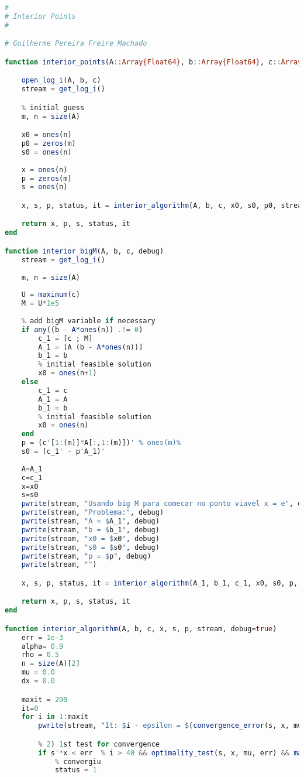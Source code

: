 \documentclass[a4paper]{IEEEtran}
\begin{document}
\begin{lstlisting}[language=Julia,numbers=none]
#
# Interior Points
#

# Guilherme Pereira Freire Machado

function interior_points(A::Array{Float64}, b::Array{Float64}, c::Array{Float64}, debug=true)

    open_log_i(A, b, c)
    stream = get_log_i()

    % initial guess
    m, n = size(A)

    x0 = ones(n)
    p0 = zeros(m)
    s0 = ones(n)
    
    x = ones(n)
    p = zeros(m)
    s = ones(n)

    x, s, p, status, it = interior_algorithm(A, b, c, x0, s0, p0, stream, debug)

    return x, p, s, status, it
end

function interior_bigM(A, b, c, debug)
    stream = get_log_i()
    
    m, n = size(A)
    
    U = maximum(c)
    M = U*1e5
    
    % add bigM variable if necessary
    if any((b - A*ones(n)) .!= 0)
        c_1 = [c ; M]
        A_1 = [A (b - A*ones(n))]
        b_1 = b
        % initial feasible solution
        x0 = ones(n+1)
    else
        c_1 = c
        A_1 = A
        b_1 = b
        % initial feasible solution
        x0 = ones(n)
    end
    p = (c'[1:(m)]*A[:,1:(m)])' % ones(m)%
    s0 = (c_1' - p'A_1)'
    
    A=A_1
    c=c_1
    x=x0
    s=s0
    pwrite(stream, "Usando big M para comecar no ponto viavel x = e", debug)
    pwrite(stream, "Problema:", debug)
    pwrite(stream, "A = $A_1", debug)
    pwrite(stream, "b = $b_1", debug)
    pwrite(stream, "x0 = $x0", debug)
    pwrite(stream, "s0 = $s0", debug)
    pwrite(stream, "p = $p", debug)
    pwrite(stream, "")

    x, s, p, status, it = interior_algorithm(A_1, b_1, c_1, x0, s0, p, stream, debug)

    return x, p, s, status, it
end 

function interior_algorithm(A, b, c, x, s, p, stream, debug=true)
    err = 1e-3
    alpha= 0.9
    rho = 0.5
    n = size(A)[2]
    mu = 0.0
    dx = 0.0

    maxit = 200
    it=0
    for i in 1:maxit
        pwrite(stream, "It: $i - epsilon = $(convergence_error(s, x, mu)) - x = $x", debug)

        % 2) 1st test for convergence
        if s'*x < err  % i > 40 && optimality_test(s, x, mu, err) && maximum(abs.(dx)) < err
            % convergiu
            status = 1


\end{lstlisting}
\end{document}
